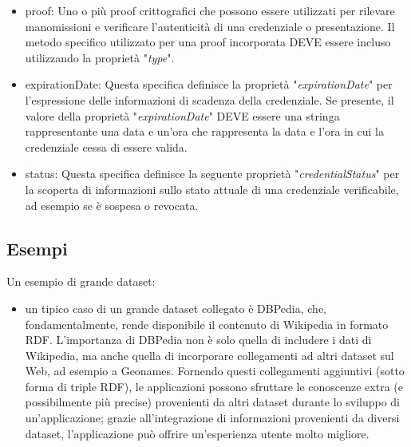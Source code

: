 \begin{itemize}
\item proof: Uno o più proof crittografici che possono essere utilizzati per rilevare manomissioni e verificare l'autenticità di una credenziale o presentazione. 
Il metodo specifico utilizzato per una proof incorporata DEVE essere incluso utilizzando la proprietà "\textit{type}".

\item expirationDate: Questa specifica definisce la proprietà "\textit{expirationDate}" per l'espressione delle informazioni di scadenza della credenziale.
Se presente, il valore della proprietà "\textit{expirationDate}" DEVE essere una stringa rappresentante una data e un'ora che rappresenta la data e l'ora in cui la credenziale cessa 
di essere valida.

\item status: Questa specifica definisce la seguente proprietà "\textit{credentialStatus}" per la scoperta di informazioni sullo stato attuale di una credenziale verificabile, ad esempio 
se è sospesa o revocata.
\end{itemize}


\subsection{Esempi}
Un esempio di grande dataset:
\begin{itemize}
    \item un tipico caso di un grande dataset collegato è DBPedia, che, fondamentalmente, rende disponibile il contenuto di Wikipedia in formato RDF. L'importanza di DBPedia non è solo quella di includere i dati di Wikipedia, ma anche quella di incorporare collegamenti ad altri dataset sul Web, ad esempio a Geonames. Fornendo questi collegamenti aggiuntivi (sotto forma di triple RDF), le applicazioni possono sfruttare le conoscenze extra (e possibilmente più precise) provenienti da altri dataset durante lo sviluppo di un'applicazione; grazie all'integrazione di informazioni provenienti da diversi dataset, l'applicazione può offrire un'esperienza utente molto migliore.
\end{itemize}

